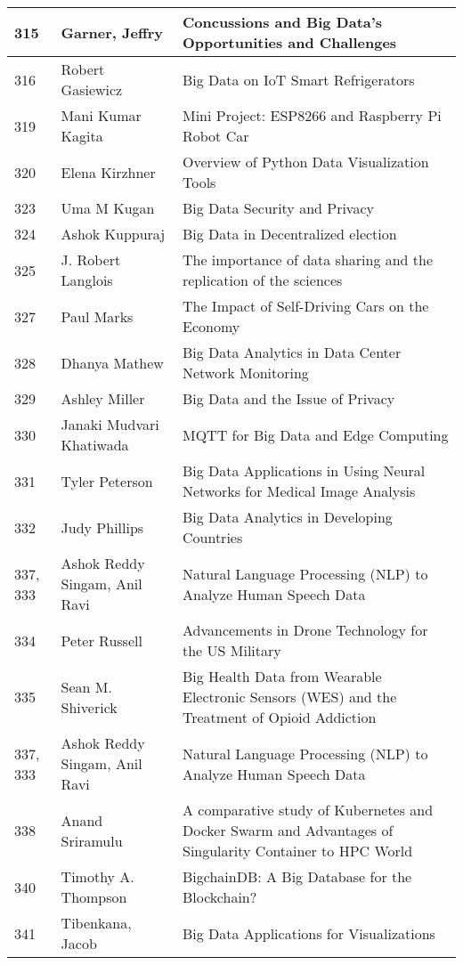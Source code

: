 \documentclass[12pt]{book}
\begin{document}
\begin{footnotesize}
\begin{longtable}{|p{1cm}p{5cm}p{9cm}|}
\hline
\hline
315 & Garner, Jeffry & Concussions and Big Data's Opportunities and Challenges  \\
\hline
316 & Robert Gasiewicz & Big Data on IoT Smart Refrigerators  \\
\hline
\hline
319 & Mani Kumar Kagita & Mini Project: ESP8266 and Raspberry Pi Robot Car  \\
\hline
320 & Elena Kirzhner & Overview of Python Data Visualization Tools  \\
\hline
323 & Uma M Kugan & Big Data Security and Privacy  \\
\hline
324 & Ashok Kuppuraj & Big Data in Decentralized election  \\
\hline
325 & J. Robert Langlois & The importance of data sharing and the replication of the sciences  \\
\hline
\hline
327 & Paul Marks & The Impact of Self-Driving Cars on the Economy  \\
\hline
328 & Dhanya Mathew & Big Data Analytics in Data Center Network Monitoring  \\
\hline
329 & Ashley Miller & Big Data and the Issue of Privacy  \\
\hline
330 & Janaki Mudvari Khatiwada & MQTT for Big Data and Edge Computing  \\
\hline
331 & Tyler Peterson & Big Data Applications in Using Neural Networks for Medical Image Analysis
  \\
\hline
332 & Judy Phillips & Big Data Analytics in Developing Countries  \\
\hline
337, 333 & Ashok Reddy Singam, Anil Ravi & Natural Language Processing (NLP) to Analyze Human Speech Data
  \\
\hline
334 & Peter Russell & Advancements in Drone Technology for the US Military  \\
\hline
335 & Sean M. Shiverick & Big Health Data from Wearable Electronic Sensors (WES) and the Treatment of Opioid Addiction
  \\
\hline
\hline
337, 333 & Ashok Reddy Singam, Anil Ravi & Natural Language Processing (NLP) to Analyze Human Speech Data
  \\
\hline
338 & Anand Sriramulu & A comparative study of Kubernetes and Docker Swarm and Advantages of Singularity Container to HPC World  \\
\hline
\hline
340 & Timothy A. Thompson & BigchainDB: A Big Database for the Blockchain?  \\
\hline
341 & Tibenkana, Jacob & Big Data Applications for Visualizations  \\

\end{longtable}
\end{footnotesize}
\end{document}
